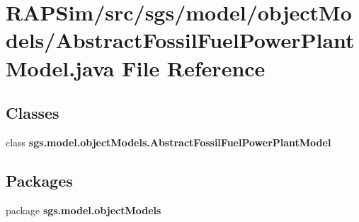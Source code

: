 \section{R\-A\-P\-Sim/src/sgs/model/object\-Models/\-Abstract\-Fossil\-Fuel\-Power\-Plant\-Model.java File Reference}
\label{_abstract_fossil_fuel_power_plant_model_8java}
\subsection*{Classes}
\begin{DoxyCompactItemize}
\item 
class {\bf sgs.\-model.\-object\-Models.\-Abstract\-Fossil\-Fuel\-Power\-Plant\-Model}
\end{DoxyCompactItemize}
\subsection*{Packages}
\begin{DoxyCompactItemize}
\item 
package {\bf sgs.\-model.\-object\-Models}
\end{DoxyCompactItemize}
